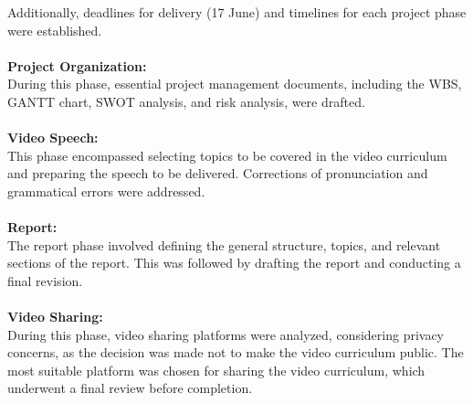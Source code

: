 \documentclass[eng]{class}
\begin{document}
Additionally, deadlines for delivery (17 June) and timelines for each project phase were established.\\
\\
\textbf{Project Organization:}\\
During this phase, essential project management documents, including the WBS, GANTT chart, SWOT analysis, and risk analysis, were drafted.\\
\\
\textbf{Video Speech:}\\ This phase encompassed selecting topics to be covered in the video curriculum and preparing the speech to be delivered.
Corrections of pronunciation and grammatical errors were addressed.\\
\\
\textbf{Report:}\\ The report phase involved defining the general structure, topics, and relevant sections of the report.
This was followed by drafting the report and conducting a final revision.\\
\\
\textbf{Video Sharing:}\\
During this phase, video sharing platforms were analyzed, considering privacy concerns,
as the decision was made not to make the video curriculum public. The most suitable platform was chosen for sharing the video curriculum,
which underwent a final review before completion.
\clearpage
\end{document}
